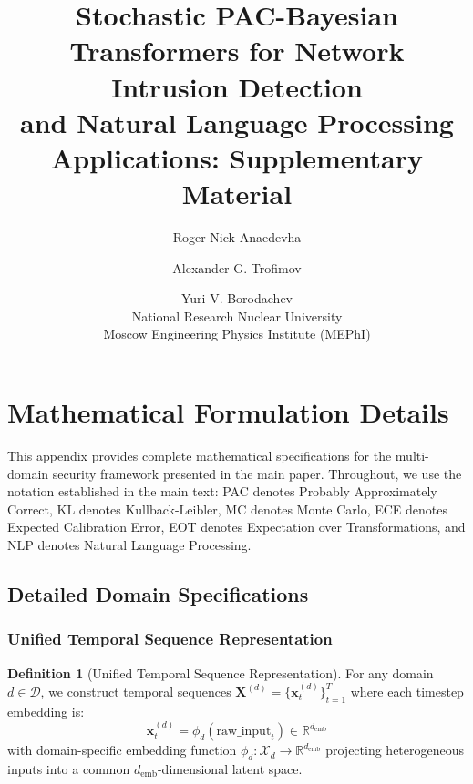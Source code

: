 \documentclass[12pt,a4paper]{article}
\theoremstyle{definition}
\newtheorem{definition}[theorem]{Definition}
\begin{document}
\title{Stochastic PAC-Bayesian Transformers for Network Intrusion Detection\\and Natural Language Processing Applications: Supplementary Material}

\author{Roger Nick Anaedevha \and Alexander G. Trofimov \and Yuri V. Borodachev\\
\small National Research Nuclear University \\ 
\small Moscow Engineering Physics Institute (MEPhI)}

\date{}
\maketitle

\tableofcontents
\newpage

\section{Mathematical Formulation Details}
\label{app:math_formulation}

This appendix provides complete mathematical specifications for the multi-domain security framework presented in the main paper. Throughout, we use the notation established in the main text: PAC denotes Probably Approximately Correct, KL denotes Kullback-Leibler, MC denotes Monte Carlo, ECE denotes Expected Calibration Error, EOT denotes Expectation over Transformations, and NLP denotes Natural Language Processing.

\subsection{Detailed Domain Specifications}

\subsubsection{Unified Temporal Sequence Representation}

\begin{definition}[Unified Temporal Sequence Representation]
\label{def:unified_sequence}
For any domain $d \in \mathcal{D}$, we construct temporal sequences $\bm{X}^{(d)} = \{\bm{x}_t^{(d)}\}_{t=1}^T$ where each timestep embedding is:
\begin{equation}
\bm{x}_t^{(d)} = \phi_d(\text{raw\_input}_t) \in \mathbb{R}^{d_{\text{emb}}}
\end{equation}
with domain-specific embedding function $\phi_d: \mathcal{X}_d \to \mathbb{R}^{d_{\text{emb}}}$ projecting heterogeneous inputs into a common $d_{\text{emb}}$-dimensional latent space.
\end{definition}
\end{document}
